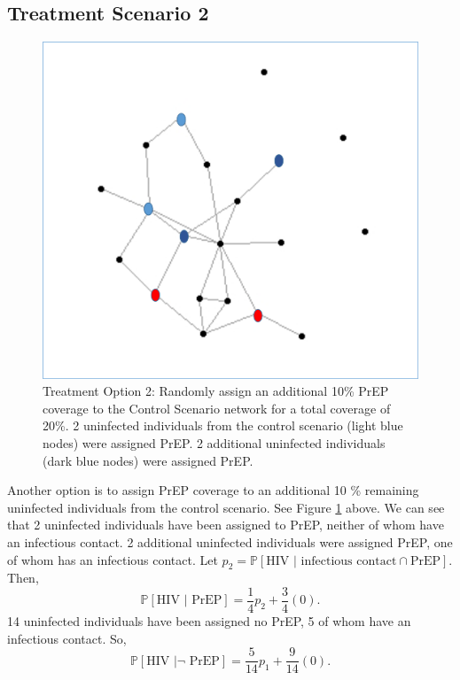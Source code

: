 \documentclass{article}
\theoremstyle{definition}
\begin{document}
\subsection{Treatment Scenario 2} 
\begin{figure}[H]
    \centering
    \includegraphics[scale=0.5]{Figures/Network Example 4.png}
    \caption{Treatment Option 2: Randomly assign an additional 10\% PrEP coverage to the Control Scenario network for a total coverage of 20\%. 2 uninfected individuals from the control scenario (light blue nodes) were assigned PrEP. 2 additional uninfected individuals (dark blue nodes) were assigned PrEP. }
    \label{fig:Figure 5}
\end{figure}

Another option is to assign PrEP coverage to an additional 10 \% remaining uninfected individuals from the control scenario. See Figure \ref{fig:Figure 5} above. 
We can see that 2 uninfected individuals have been assigned to PrEP, neither of whom have an infectious contact. 2 additional uninfected individuals were assigned PrEP, one of whom has an infectious contact. Let $p_{2}=\mathbb{P}\left[\text{HIV } \vert \text{ infectious contact} \cap \text{PrEP}\right].$ Then, $$\mathbb{P}\left[\text{HIV } \vert \text{ PrEP}\right]=\frac{1}{4}p_{2}+\frac{3}{4}\left(0\right).$$  
14 uninfected individuals have been assigned no PrEP, 5 of whom have an infectious contact. So, $$\mathbb{P}\left[\text{HIV } \vert \neg \text{ PrEP}\right]=\frac{5}{14}p_{1}+\frac{9}{14}\left(0\right).$$
\end{document}
